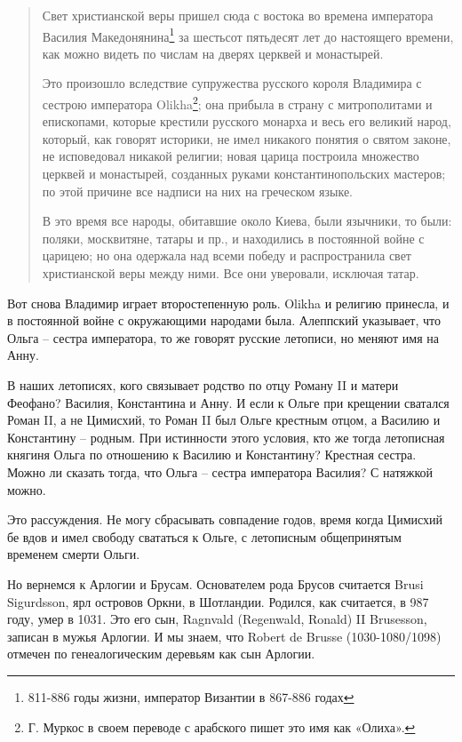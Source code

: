 \begin{quotation}
Свет христианской веры пришел сюда с востока во времена императора Василия Македонянина\footnote{811-886 годы жизни, император Византии в 867-886 годах} за шестьсот пятьдесят лет до настоящего времени, как можно видеть по числам на дверях церквей и монастырей.

Это произошло вследствие супружества русского короля Владимира с сестрою императора Olikha\footnote{Г. Муркос в своем переводе с арабского пишет это имя как «Олиха».}; она прибыла в страну с митрополитами и епископами, которые крестили русского монарха и весь его великий народ, который, как говорят историки, не имел никакого понятия о святом законе, не исповедовал никакой религии; новая царица построила множество церквей и монастырей, созданных руками константинопольских мастеров; по этой причине все надписи на них на греческом языке.

В это время все народы, обитавшие около Киева, были язычники, то были: поляки, москвитяне, татары и пр., и находились в постоянной войне с царицею; но она одержала над всеми победу и распространила свет христианской веры между ними. Все они уверовали, исключая татар.
\end{quotation}

Вот снова Владимир играет второстепенную роль. Olikha и религию принесла, и в постоянной войне с окружающими народами была. Алеппский указывает, что Ольга – сестра императора, то же говорят русские летописи, но меняют имя на Анну.

В наших летописях, кого связывает родство по отцу Роману II и матери Феофано? Василия, Константина и Анну. И если к Ольге при крещении сватался Роман II, а не Цимисхий, то Роман II был Ольге крестным отцом, а Василию и Константину – родным. При истинности этого условия, кто же тогда летописная княгиня Ольга по отношению к Василию и Константину? Крестная сестра. Можно ли сказать тогда, что Ольга – сестра императора Василия? С натяжкой можно.

Это рассуждения. Не могу сбрасывать совпадение годов, время когда Цимисхий бе вдов и имел свободу свататься к Ольге, с летописным общепринятым временем смерти Ольги.

Но вернемся к Арлогии и Брусам. Основателем рода Брусов считается Brusi Sigurdsson, ярл островов Оркни, в Шотландии. Родился, как считается, в 987 году, умер в 1031. Это его сын, Ragnvald (Regenwald, Ronald) II Brusesson, записан в мужья Арлогии. И мы знаем, что Robert de Brusse (1030-1080/1098) отмечен по генеалогическим деревьям как сын Арлогии.

